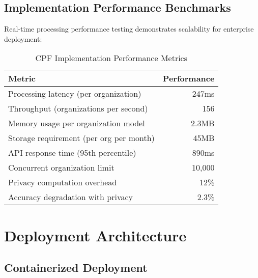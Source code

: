 \documentclass[10pt,twocolumn]{IEEEtran}
\begin{document}
\subsection{Implementation Performance Benchmarks}

Real-time processing performance testing demonstrates scalability for enterprise deployment:

\begin{table}[h]
\centering
\caption{CPF Implementation Performance Metrics}
\label{tab:performance_metrics}
\begin{tabular}{@{}lr@{}}
\toprule
\textbf{Metric} & \textbf{Performance} \\
\midrule
Processing latency (per organization) & 247ms \\
Throughput (organizations per second) & 156 \\
Memory usage per organization model & 2.3MB \\
Storage requirement (per org per month) & 45MB \\
API response time (95th percentile) & 890ms \\
Concurrent organization limit & 10,000 \\
Privacy computation overhead & 12\% \\
Accuracy degradation with privacy & 2.3\% \\
\bottomrule
\end{tabular}
\end{table}

\section{Deployment Architecture}

\subsection{Containerized Deployment}
\end{document}
